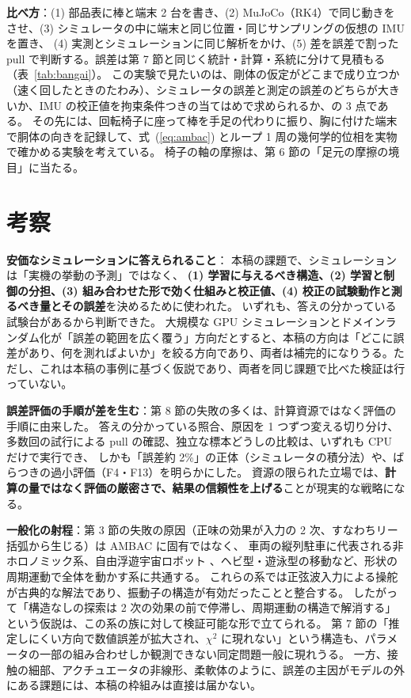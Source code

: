 \documentclass[paper=a4paper,fontsize=10pt,twocolumn,column_gap=2zw,line_length=24zw,number_of_lines=46,head_space=20mm]{jlreq}
\begin{document}
\textbf{比べ方}：(1) 部品表に棒と端末 2 台を書き、(2) MuJoCo（RK4）で同じ動きをさせ、(3) シミュレータの中に端末と同じ位置・同じサンプリングの仮想の IMU を置き、
(4) 実測とシミュレーションに同じ解析をかけ、(5) 差を誤差で割った pull で判断する。誤差は第 7 節と同じく統計・計算・系統に分けて見積もる（表~\ref{tab:bangai}）。
この実験で見たいのは、剛体の仮定がどこまで成り立つか（速く回したときのたわみ）、シミュレータの誤差と測定の誤差のどちらが大きいか、IMU の校正値を拘束条件つきの当てはめで求められるか、の 3 点である。
その先には、回転椅子に座って棒を手足の代わりに振り、胸に付けた端末で胴体の向きを記録して、式~(\ref{eq:ambac}) とループ 1 周の幾何学的位相を実物で確かめる実験を考えている。
椅子の軸の摩擦は、第 6 節の「足元の摩擦の境目」に当たる。


\section{考察}

\textbf{安価なシミュレーションに答えられること}：
本稿の課題で、シミュレーションは「実機の挙動の予測」ではなく、
\textbf{(1) 学習に与えるべき構造、(2) 学習と制御の分担、(3) 組み合わせた形で効く仕組みと校正値、(4) 校正の試験動作と測るべき量とその誤差}を決めるために使われた。
いずれも、答えの分かっている試験台があるから判断できた。
大規模な GPU シミュレーションとドメインランダム化が「誤差の範囲を広く覆う」方向だとすると、本稿の方向は「どこに誤差があり、何を測ればよいか」を絞る方向であり、両者は補完的になりうる。ただし、これは本稿の事例に基づく仮説であり、両者を同じ課題で比べた検証は行っていない。

\textbf{誤差評価の手順が差を生む}：第 8 節の失敗の多くは、計算資源ではなく評価の手順に由来した。
答えの分かっている照合、原因を 1 つずつ変える切り分け、多数回の試行による pull の確認、独立な標本どうしの比較は、いずれも CPU だけで実行でき、
しかも「誤差約 2\%」の正体（シミュレータの積分法）や、ばらつきの過小評価（F4・F13）を明らかにした。
資源の限られた立場では、\textbf{計算の量ではなく評価の厳密さで、結果の信頼性を上げる}ことが現実的な戦略になる。

\textbf{一般化の射程}：第 3 節の失敗の原因（正味の効果が入力の 2 次、すなわちリー括弧から生じる）は AMBAC に固有ではなく、
車両の縦列駐車に代表される非ホロノミック系、自由浮遊宇宙ロボット \cite{nakamura1991}、ヘビ型・遊泳型の移動など、形状の周期運動で全体を動かす系に共通する。
これらの系では正弦波入力による操舵 \cite{murray1993} が古典的な解法であり、振動子の構造が有効だったことと整合する。
したがって「構造なしの探索は 2 次の効果の前で停滞し、周期運動の構造で解消する」という仮説は、この系の族に対して検証可能な形で立てられる。
第 7 節の「推定しにくい方向で数値誤差が拡大され、$\chi^2$ に現れない」という構造も、パラメータの一部の組み合わせしか観測できない同定問題一般に現れうる。
一方、接触の細部、アクチュエータの非線形、柔軟体のように、誤差の主因がモデルの外にある課題には、本稿の枠組みは直接は届かない。
\end{document}
